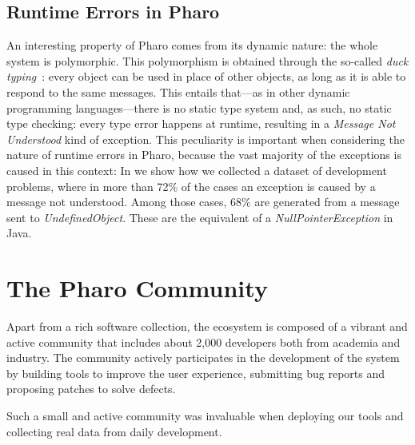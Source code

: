 \subsection{Runtime Errors in Pharo}
An interesting property of Pharo comes from its dynamic nature: the whole system is polymorphic.
This polymorphism is obtained through the so-called \emph{duck typing}~\cite{Chugh2012}: every object can be used in place of other objects, as long as it is able to respond to the same messages.
This entails that---as in other dynamic programming languages---there is no static type system and, as such, no static type checking: every type error happens at runtime, resulting in a \emph{Message Not Understood} kind of exception.
This peculiarity is important when considering the nature of runtime errors in Pharo, because the vast majority of the exceptions is caused in this context: In  we show how we collected a dataset of development problems, where in more than 72\% of the cases an exception is caused by a message not understood.
Among those cases, 68\% are generated from a message sent to \emph{UndefinedObject}.
These are the equivalent of a \emph{NullPointerException} in Java.


\section{The Pharo Community}
Apart from a rich software collection, the \pha ecosystem is composed of a vibrant and active community that includes about 2,000 developers both from academia and industry.
The community actively participates in the development of the system by building tools to improve the user experience, submitting bug reports and proposing patches to solve defects.

Such a small and active community was invaluable when deploying our tools and collecting real data from daily development.
